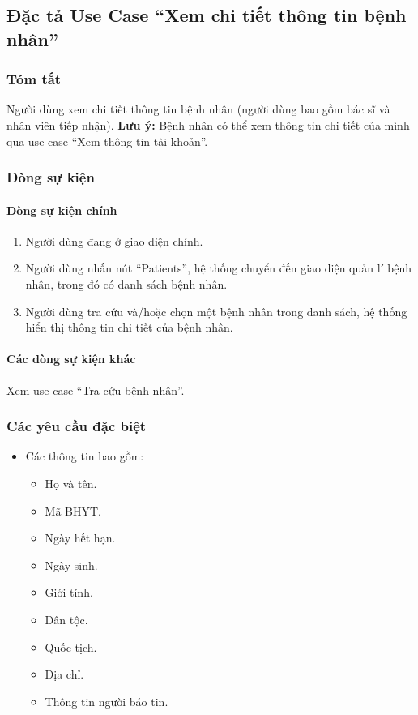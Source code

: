 \subsection{Đặc tả Use Case ``Xem chi tiết thông tin bệnh nhân''}

\subsubsection{Tóm tắt}
Người dùng xem chi tiết thông tin bệnh nhân (người dùng bao gồm bác sĩ và nhân viên tiếp nhận).
\textbf{Lưu ý:} Bệnh nhân có thể xem thông tin chi tiết của mình qua use case ``Xem thông tin tài khoản''.

\subsubsection{Dòng sự kiện}
\paragraph{\textbf{Dòng sự kiện chính}}
\begin{enumerate}
  \item Người dùng đang ở giao diện chính.
  \item Người dùng nhấn nút ``Patients'', hệ thống chuyển đến giao diện quản lí bệnh nhân, trong đó có danh sách bệnh nhân.
  \item Người dùng tra cứu và/hoặc chọn một bệnh nhân trong danh sách, hệ thống hiển thị thông tin chi tiết của bệnh nhân.
\end{enumerate}

\paragraph{\textbf{Các dòng sự kiện khác}}
Xem use case ``Tra cứu bệnh nhân''.

\subsubsection{Các yêu cầu đặc biệt}
\begin{itemize}
  \item Các thông tin bao gồm:
    \begin{itemize}
      \item Họ và tên.
      \item Mã BHYT.
      \item Ngày hết hạn.
      \item Ngày sinh.
      \item Giới tính.
      \item Dân tộc.
      \item Quốc tịch.
      \item Địa chỉ.
      \item Thông tin người báo tin.
    \end{itemize}
\end{itemize}

